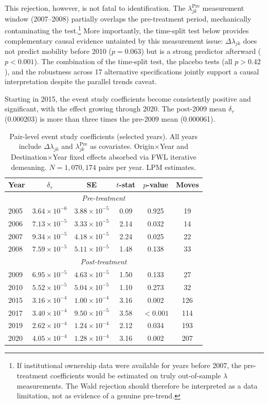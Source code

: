 \documentclass[11pt,a4paper]{article}
\begin{document}
This rejection, however, is not fatal to identification. The $\lambda_{jk}^{\text{Pre}}$ measurement window (2007--2008) partially overlaps the pre-treatment period, mechanically contaminating the test.\footnote{If institutional ownership data were available for years before 2007, the pre-treatment coefficients would be estimated on truly out-of-sample $\lambda$ measurements. The Wald rejection should therefore be interpreted as a data limitation, not as evidence of a genuine pre-trend.} More importantly, the time-split test below provides complementary causal evidence untainted by this measurement issue: $\Delta\lambda_{jk}$ does not predict mobility before 2010 ($p=0.063$) but is a strong predictor afterward ($p<0.001$). The combination of the time-split test, the placebo tests (all $p > 0.42$), and the robustness across 17 alternative specifications jointly support a causal interpretation despite the parallel trends caveat.

Starting in 2015, the event study coefficients become consistently positive and significant, with the effect growing through 2020. The post-2009 mean $\delta_\tau$ (0.000203) is more than three times the pre-2009 mean (0.000061).

\begin{table}[h!]
\centering
\begin{tabular}{lccccc}
\toprule
\textbf{Year} & \textbf{$\delta_\tau$} & \textbf{SE} & \textbf{$t$-stat} & \textbf{$p$-value} & \textbf{Moves} \\
\midrule
\multicolumn{6}{c}{\textit{Pre-treatment}} \\
2005 & $3.64\times10^{-6}$ & $3.88\times10^{-5}$ & 0.09 & 0.925 & 19 \\
2006 & $7.13\times10^{-5}$ & $3.33\times10^{-5}$ & 2.14 & 0.032 & 14 \\
2007 & $9.34\times10^{-5}$ & $4.18\times10^{-5}$ & 2.24 & 0.025 & 22 \\
2008 & $7.59\times10^{-5}$ & $5.11\times10^{-5}$ & 1.48 & 0.138 & 33 \\
\midrule
\multicolumn{6}{c}{\textit{Post-treatment}} \\
2009 & $6.95\times10^{-5}$ & $4.63\times10^{-5}$ & 1.50 & 0.133 & 27 \\
2010 & $5.52\times10^{-5}$ & $5.04\times10^{-5}$ & 1.10 & 0.273 & 32 \\
2015 & $3.16\times10^{-4}$ & $1.00\times10^{-4}$ & 3.16 & 0.002 & 126 \\
2017 & $3.40\times10^{-4}$ & $9.50\times10^{-5}$ & 3.58 & $<0.001$ & 114 \\
2019 & $2.62\times10^{-4}$ & $1.24\times10^{-4}$ & 2.12 & 0.034 & 193 \\
2020 & $4.05\times10^{-4}$ & $1.28\times10^{-4}$ & 3.16 & 0.002 & 207 \\
\bottomrule
\end{tabular}
\caption{Pair-level event study coefficients (selected years). All years include $\Delta\lambda_{jk}$ and $\lambda_{jk}^{\text{Pre}}$ as covariates. Origin$\times$Year and Destination$\times$Year fixed effects absorbed via FWL iterative demeaning. $N=1{,}070{,}174$ pairs per year. LPM estimates.}
\label{tab:es}
\end{table}
\end{document}
